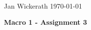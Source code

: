 \documentclass{article}
\begin{document}
\thispagestyle{empty}
\noindent Jan Wickerath  \hfill \today \\
\begin{center}
\Large \textbf{Macro 1 - Assignment 3}
\end{center}
\vspace{1cm}


% 
% 
\end{document}
